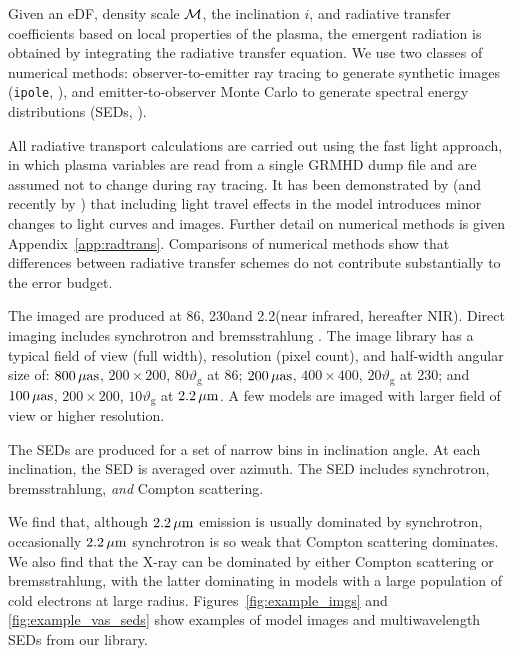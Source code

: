 Given an eDF, density scale $\mathcal{M}$, the inclination $i$, and radiative transfer coefficients based on local properties of the plasma, the emergent radiation is obtained by integrating the radiative transfer equation.
We use two classes of numerical methods: observer-to-emitter ray tracing to generate synthetic images ({\tt ipole}, \citealt{2018MNRAS.475...43M}), and emitter-to-observer Monte Carlo to generate spectral energy distributions (SEDs, \citealt{2009ApJS..184..387D}).

All radiative transport calculations are carried out using the fast light approach, in which plasma variables are read from a single GRMHD dump file and are assumed not to change during ray tracing.
It has been demonstrated by \citet{2010ApJ...717.1092D} (and recently by \citealt{2021MNRAS.508.4282M}) that including light travel effects in the model introduces minor changes to light curves and images.
Further detail on numerical methods is given Appendix~\ref{app:radtrans}.
Comparisons of numerical methods \citep{2020ApJ...897..148G, Prather_et_al_2022} show that differences between radiative transfer schemes do not contribute substantially to the error budget.

The imaged are produced at 86\GHz, 230\GHz and 2.2\um (near infrared, hereafter NIR).
Direct imaging includes synchrotron and bremsstrahlung \citep[both ion-electron and electron-electron; see][for a recent review]{2020ApJ...898...50Y}.  The image library has a typical field of view (full width), resolution (pixel count), and half-width angular size of: $800\,\mathrm{\mu as}$, $200 \times 200$, $80 \vartheta_\mathrm{g}$ at 86\GHz; $200\,\mathrm{\mu as}$, $400 \times 400$, $20 \vartheta_\mathrm{g}$ at 230\GHz; and $100\,\mathrm{\mu as}$, $200\times 200$, $10 \vartheta_\mathrm{g}$ at $2.2\,\mu\mathrm{m}$.  A few models are imaged with larger field of view or higher resolution.

The SEDs are produced for a set of narrow bins in inclination angle. At each inclination, the SED is averaged over azimuth.  The SED includes synchrotron, bremsstrahlung, \emph{and} Compton scattering.

We find that, although $2.2\,\mu\mathrm{m}$ emission is usually dominated by synchrotron, occasionally $2.2\,\mu\mathrm{m}$ synchrotron is so weak that Compton scattering dominates.  We also find that the X-ray can be dominated by either Compton scattering or bremsstrahlung, with the latter dominating in models with a large population of cold electrons at large radius.
Figures~\ref{fig:example_imgs} and \ref{fig:example_vas_seds} show examples of model images and multiwavelength SEDs from our library.


